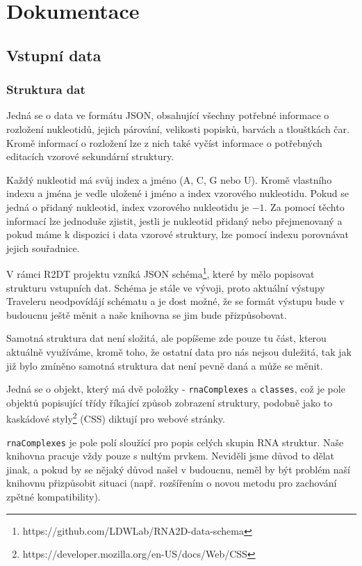 \chapter{Dokumentace}

\section{Vstupní data}

\subsection{Struktura dat}

Jedná se o data ve formátu JSON, obsahující všechny potřebné informace o
rozložení nukleotidů, jejich párování, velikosti popisků, barvách a tlouštkách
čar. Kromě informací o rozložení lze z nich také vyčíst informace o potřebných
editacích vzorové sekundární struktury.

Každý nukleotid má svůj index a jméno (A, C, G nebo U). Kromě vlastního indexu
a jména je vedle uložené i jméno a index vzorového nukleotidu. Pokud se jedná o
přidaný nukleotid, index vzorového nukleotidu je $-1$. Za pomocí těchto
informací lze jednoduše zjistit, jestli je nukleotid přidaný nebo přejmenovaný
a pokud máme k dispozici i data vzorové struktury, lze pomocí indexu porovnávat
jejich souřadnice.

V rámci R2DT projektu vzníká JSON
schéma\footnote{https://github.com/LDWLab/RNA2D-data-schema}, které by mělo
popisovat strukturu vstupních dat. Schéma je stále ve vývoji, proto aktuální
výstupy Traveleru neodpovídájí schématu a je dost možné, že se formát výstupu
bude v budoucnu ještě měnit a naše knihovna se jim bude přizpůsobovat.

Samotná struktura dat není složitá, ale popíšeme zde pouze tu část, kterou
aktuálně využíváme, kromě toho, že ostatní data pro nás nejsou duležitá, tak
jak již bylo zmíněno samotná struktura dat není pevně daná a může se měnit.

Jedná se o objekt, který má dvě položky - \texttt{rnaComplexes} a
\texttt{classes}, což je pole objektů popisující třídy říkající způsob
zobrazení struktury, podobně jako to kaskádové
styly\footnote{https://developer.mozilla.org/en-US/docs/Web/CSS} (CSS) diktují
pro webové stránky. 

\texttt{rnaComplexes} je pole polí sloužící pro popis celých skupin RNA
struktur. Naše knihovna pracuje vždy pouze s nultým prvkem. Neviděli jsme důvod
to dělat jinak, a pokud by se nějaký důvod našel v budoucnu, neměl by být
problém naší knihovnu přizpůsobit situaci (např. rozšířením o novou metodu pro
zachování zpětné kompatibility).

